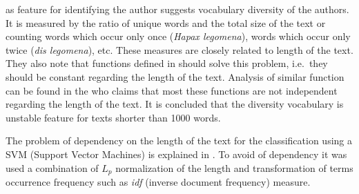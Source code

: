 \documentclass[11pt,english]{article}
\begin{document}
\begin{multicols}{2}
\citet{stamatatos2001computer} as feature for identifying the author suggests
vocabulary diversity of the authors. It is measured by the ratio of unique words
and the total size of the text or counting words which occur only once
(\emph{Hapax legomena}), words which occur only twice (\emph{dis legomena}), etc.
These measures are closely related to length of the text. They also note that
functions defined in \citep{yule1944statistical,honore1979some}
should solve this problem, i.e.\ they should be constant regarding the length of
the text. Analysis of similar function can be found in the
\citep{tweedie1998variable} who claims that most these functions are not
independent regarding the length of the text. It is concluded that the diversity
vocabulary is unstable feature for texts shorter than 1000 words.

The problem of dependency on the length of the text for the classification using
a SVM (Support Vector Machines) is explained in \citep{diederich2003authorship}.
To avoid of dependency it was used a combination of $L_p$ normalization of the
length and transformation of terms occurrence frequency such as \emph{idf}
(inverse document frequency) measure.


\end{multicols}
\end{document}
